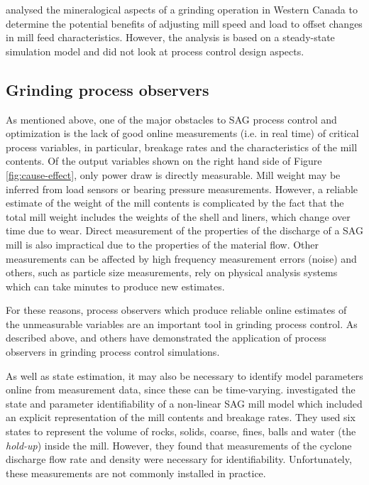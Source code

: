 \cite{liu_development_2018} analysed the mineralogical aspects of a grinding operation in Western Canada to determine the potential benefits of adjusting mill speed and load to offset changes in mill feed characteristics. However, the analysis is based on a steady-state simulation model and did not look at process control design aspects.


\subsection{Grinding process observers}

As mentioned above, one of the major obstacles to SAG process control and optimization is the lack of good online measurements (i.e. in real time) of critical process variables, in particular, breakage rates and the characteristics of the mill contents. Of the output variables shown on the right hand side of Figure \ref{fig:cause-effect}, only power draw is directly measurable. Mill weight may be inferred from load sensors or bearing pressure measurements. However, a reliable estimate of the weight of the mill contents is complicated by the fact that the total mill weight includes the weights of the shell and liners, which change over time due to wear. Direct measurement of the properties of the discharge of a SAG mill is also impractical due to the properties of the material flow.  Other measurements can be affected by high frequency measurement errors (noise) and others, such as particle size measurements, rely on physical analysis systems which can take minutes to produce new estimates.

For these reasons, process observers which produce reliable online estimates of the unmeasurable variables are an important tool in grinding process control.  As described above, \cite{le_roux_throughput_2016} and others have demonstrated the application of process observers in grinding process control simulations.  

As well as state estimation, it may also be necessary to identify model parameters online from measurement data, since these can be time-varying. \cite{le_roux_state_2016} investigated the state and parameter identifiability of a non-linear SAG mill model which included an explicit representation of the mill contents and breakage rates. They used six states to represent the volume of rocks, solids, coarse, fines, balls and water (the \textit{hold-up}) inside the mill. However, they found that measurements of the cyclone discharge flow rate and density were necessary for identifiability. Unfortunately, these measurements are not commonly installed in practice.

